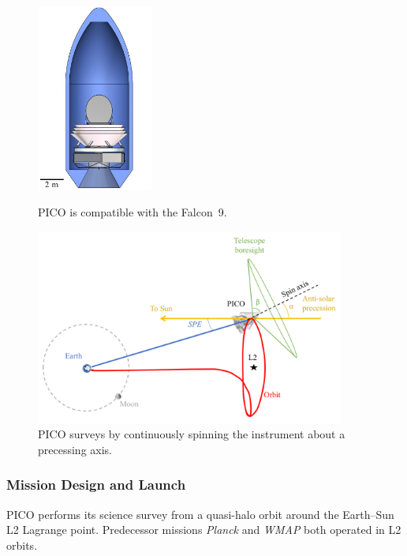 \begin{figure}[!b]
  \begin{minipage}[b]{0.29\textwidth}
    \begin{center}
    \includegraphics[width=1.5in]{figures/InFairing.JPG}
\caption{\captiontext PICO is compatible with the Falcon~9.\label{fig:InFairing}}
    \end{center}
  \end{minipage}
%
\hfill
\begin{minipage}[b]{0.67\textwidth}
    \begin{center}
    \includegraphics[width=4in]{figures/MissionDesignFigure.png}
\caption{\captiontext
  PICO surveys by continuously spinning the instrument about a
  precessing axis.\label{fig:MissionDesignFigure}}
   \end{center}
  \end{minipage}
\end{figure}

\subsubsection{Mission Design and Launch}
\label{sec:mission_design} %

PICO performs its science survey from a quasi-halo orbit around the
Earth--Sun L2 Lagrange point. Predecessor missions \textit{Planck} and
\textit{WMAP} both operated in L2 orbits.

